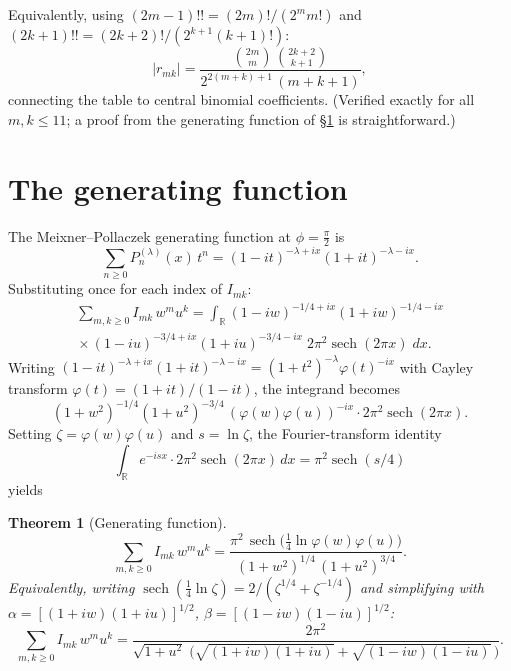 \documentclass[11pt,a4paper]{article}
\newtheorem{theorem}{Theorem}[section]
\newcommand{\R}{\mathbb{R}}
\begin{document}
Equivalently, using $(2m{-}1)!! = (2m)!/(2^m m!)$ and
$(2k{+}1)!! = (2k{+}2)!/(2^{k+1}(k{+}1)!)$:
\[
  |r_{mk}|
  = \frac{\binom{2m}{m}\,\binom{2k{+}2}{k{+}1}}
         {2^{2(m+k)+1}\,(m{+}k{+}1)},
\]
connecting the table to central binomial coefficients.
(Verified exactly for all $m,k \le 11$; a proof from the
generating function of \S\ref{sec:gf} is straightforward.)

\section{The generating function}\label{sec:gf}

The Meixner--Pollaczek generating function at $\phi = \tfrac\pi2$
is
\[
  \sum_{n\ge0} P_n^{(\lambda)}(x)\, t^n
  = (1-it)^{-\lambda+ix}(1+it)^{-\lambda-ix}.
\]
Substituting once for each index of $I_{mk}$:
\begin{multline*}
  \sum_{m,k\ge0} I_{mk}\, w^m u^k
  = \int_\R
    (1{-}iw)^{-1/4+ix}(1{+}iw)^{-1/4-ix}\\
    {}\times(1{-}iu)^{-3/4+ix}(1{+}iu)^{-3/4-ix}\;
    2\pi^2\operatorname{sech}(2\pi x)\; dx.
\end{multline*}
Writing
$(1{-}it)^{-\lambda+ix}(1{+}it)^{-\lambda-ix}
= (1{+}t^2)^{-\lambda}\varphi(t)^{-ix}$
with Cayley transform $\varphi(t) = (1{+}it)/(1{-}it)$,
the integrand becomes
\[
  (1{+}w^2)^{-1/4}(1{+}u^2)^{-3/4}\,
    (\varphi(w)\varphi(u))^{-ix}\cdot
    2\pi^2\!\operatorname{sech}(2\pi x).
\]
Setting $\zeta = \varphi(w)\varphi(u)$ and $s = \ln\zeta$,
the Fourier-transform identity
\[
  \textstyle\int_\R e^{-isx}\cdot
  2\pi^2\operatorname{sech}(2\pi x)\,dx
  = \pi^2\operatorname{sech}(s/4)
\]
yields

\begin{theorem}[Generating function]\label{thm:gf}
\begin{equation}\label{eq:gf}
  \sum_{m,k\ge0} I_{mk}\, w^m u^k
  = \frac{\pi^2\,\operatorname{sech}\!\bigl(\tfrac14
    \ln\varphi(w)\varphi(u)\bigr)}
    {(1+w^2)^{1/4}\,(1+u^2)^{3/4}}.
\end{equation}
Equivalently, writing
$\operatorname{sech}(\tfrac14\ln\zeta)
= 2/(\zeta^{1/4}+\zeta^{-1/4})$ and simplifying with
$\alpha = [(1{+}iw)(1{+}iu)]^{1/2}$,
$\beta = [(1{-}iw)(1{-}iu)]^{1/2}$:
\begin{equation}\label{eq:gf2}
  \sum_{m,k\ge0} I_{mk}\, w^m u^k
  = \frac{2\pi^2}
    {\sqrt{1{+}u^2}\;\bigl(\!\sqrt{(1{+}iw)(1{+}iu)}
      + \sqrt{(1{-}iw)(1{-}iu)}\,\bigr)}.
\end{equation}
\end{theorem}
\end{document}

